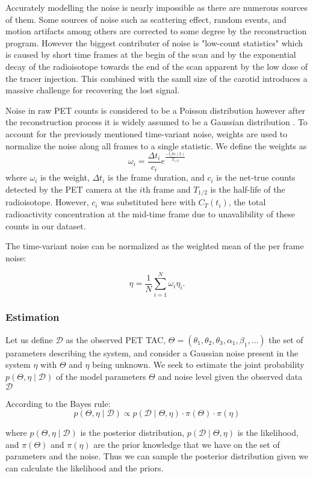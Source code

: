 Accurately modelling the noise is nearly impossible as there are numerous sources of them.
Some sources of noise such as scattering effect, random events, and motion artifacts among others are corrected to some degree by the reconstruction program.
However the biggest contributer of noise is "low-count statistics" which is caused by short time frames at the begin of the scan and by the exponential decay of the radioisotope towards the end of the scan apparent by the low dose of the tracer injection.
This combined with the samll size of the carotid introduces a massive challenge for recovering the lost signal.

Noise in raw PET counts is considered to be a Poisson distribution however after the reconstruction process it is widely assumed to be a Gaussian distribution \cite{TODO}. To account for the previously mentioned time-variant noise, weights are used to normalize the noise along all frames to a single statistic. We define the weights as
\[
	\omega_{i} = \frac{\Delta t_i}{c_i} e^{\frac{-t_{i} ln(2)}{T_{1/2}}}
\]
where \(\omega_i\) is the weight, \(\Delta t_i\) is the frame duration, and \(c_i\) is the net-true counts detected by the PET camera at the \(i\)th frame and  \(T_{1/2}\) is the half-life of the radioisotope.
However, \(c_i\) was substituted here with \(C_T(t_i)\), the total radioactivity concentration at the mid-time frame due to unavalibility of these counts in our dataset.

The time-variant noise can be normalized as the weighted mean of the per frame noise:

\[
	\eta= \frac{1}{N} \sum_{i=1}^{N} \omega_i \eta_{i}.
\]

\subsubsection{Estimation}
Let us define  \(\mathcal{D}\) as the observed PET TAC, \( \Theta = (\theta_{1}, \theta_{2}, \theta_{3}, \alpha_{1}, \beta_{1}, \dots) \) the set of parameters describing the system, and consider a Gaussian noise present in the system \(\eta\) with \(\Theta\) and \(\eta\) being unknown. We seek to estimate the joint probability \(p(\Theta,\eta \mid \mathcal{D})\) of the model parameters \(\Theta\) and noise level given the observed data \(\mathcal{D}\)

According to the Bayes rule:
\[
    p(\Theta,\eta \mid \mathcal{D}) \propto p(\mathcal{D} \mid \Theta,\eta) \cdot \pi( \Theta ) \cdot \pi( \eta )
\]

where  \(p(\Theta,\eta \mid \mathcal{D})\) is the posterior distribution, \(p(\mathcal{D} \mid \Theta,\eta)\) is the likelihood, and $\pi(\Theta)$ and $\pi(\eta)$ are the prior knowledge that we have on the set of parameters and the noise. Thus we can sample the posterior distribution given we can calculate the likelihood and the priors.

